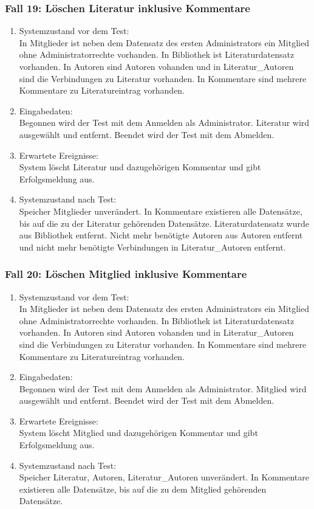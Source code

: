 \subsubsection{Fall 19: Löschen Literatur inklusive Kommentare}
\begin{enumerate}
\item Systemzustand vor dem Test:\\
	In Mitglieder ist neben dem Datensatz des ersten Administrators ein Mitglied ohne Administratorrechte vorhanden. In Bibliothek ist Literaturdatensatz vorhanden. In Autoren sind Autoren vohanden und in Literatur\_Autoren sind die Verbindungen zu Literatur vorhanden. In Kommentare sind mehrere Kommentare zu Literatureintrag vorhanden.
\item Eingabedaten:\\
	Begonnen wird der Test mit dem Anmelden als Administrator. Literatur wird ausgewählt und entfernt. Beendet wird der Test mit dem Abmelden.
\item Erwartete Ereignisse:\\
	System löscht Literatur und dazugehörigen Kommentar und gibt Erfolgsmeldung aus.
\item Systemzustand nach Test:\\
	Speicher Mitglieder unverändert. In Kommentare existieren alle Datensätze, bis auf die zu der Literatur gehörenden Datensätze. Literaturdatensatz wurde aus Bibliothek entfernt. Nicht mehr benötigte Autoren aus Autoren entfernt und nicht mehr benötigte Verbindungen in Literatur\_Autoren entfernt.
\end{enumerate}

\subsubsection{Fall 20: Löschen Mitglied inklusive Kommentare}
\begin{enumerate}
\item Systemzustand vor dem Test:\\
	In Mitglieder ist neben dem Datensatz des ersten Administrators ein Mitglied ohne Administratorrechte vorhanden. In Bibliothek ist Literaturdatensatz vorhanden. In Autoren sind Autoren vohanden und in Literatur\_Autoren sind die Verbindungen zu Literatur vorhanden. In Kommentare sind mehrere Kommentare zu Literatureintrag vorhanden.
\item Eingabedaten:\\
	Begonnen wird der Test mit dem Anmelden als Administrator. Mitglied wird ausgewählt und entfernt. Beendet wird der Test mit dem Abmelden.
\item Erwartete Ereignisse:\\
	System löscht Mitglied und dazugehörigen Kommentar und gibt Erfolgsmeldung aus.
\item Systemzustand nach Test:\\
	Speicher Literatur, Autoren, Literatur\_Autoren unverändert. In Kommentare existieren alle Datensätze, bis auf die zu dem Mitglied gehörenden Datensätze.
\end{enumerate}

